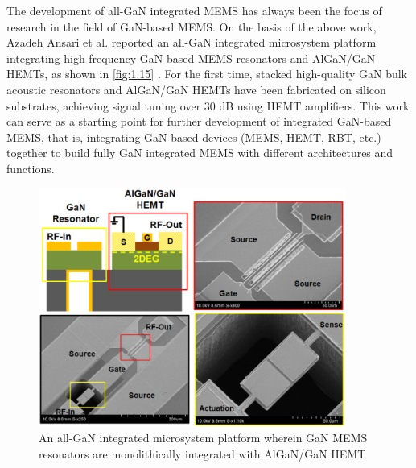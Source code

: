 The development of all-GaN integrated  MEMS has always been the focus of research in the field of GaN-based MEMS. On the basis of the above work, Azadeh Ansari et al. reported an all-GaN integrated microsystem platform integrating high-frequency GaN-based MEMS resonators and AlGaN/GaN HEMTs, as shown in \autoref{fig:1.15} \cite{ansari2012monolithic}. For the first time, stacked high-quality GaN bulk acoustic resonators and AlGaN/GaN  HEMTs have been fabricated on  silicon substrates, achieving signal tuning over 30 \unit{\dB} using HEMT  amplifiers. This work can serve as a starting point for further development of integrated GaN-based MEMS, that is, integrating GaN-based devices (MEMS, HEMT, RBT, etc.) together to build fully GaN integrated MEMS with different architectures and functions.

\begin{figure}[H] 
\centering    
\includegraphics[width=0.9\textwidth]{ch1_15}
\caption[An all-GaN integrated microsystem platform wherein GaN MEMS resonators are monolithically integrated with AlGaN/GaN HEMT]{An all-GaN integrated microsystem platform wherein GaN MEMS resonators are monolithically integrated with AlGaN/GaN HEMT \protect\cite{ansari2012monolithic}}
\label{fig:1.15}
\end{figure}


